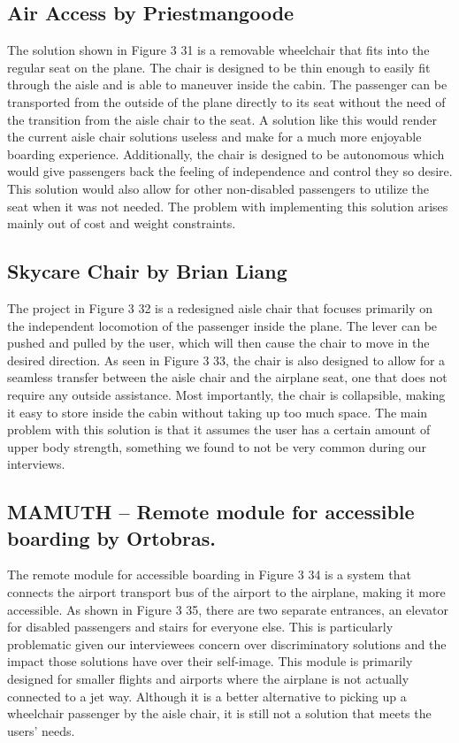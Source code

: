 \documentclass[a4paper, 12pt,conference]{new_cit_thesis}
\begin{document}
\subsection{Air Access by Priestmangoode}
The solution shown in Figure 3 31 is a removable wheelchair that fits into the regular seat on the plane. The chair is designed to be thin enough to easily fit through the aisle and is able to maneuver inside the cabin. The passenger can be transported from the outside of the plane directly to its seat without the need of the transition from the aisle chair to the seat.  A solution like this would render the current aisle chair solutions useless and make for a much more enjoyable boarding experience. Additionally, the chair is designed to be autonomous which would give passengers back the feeling of independence and control they so desire. This solution would also allow for other non-disabled passengers to utilize the seat when it was not needed. The problem with implementing this solution arises mainly out of cost and weight constraints.

\subsection{Skycare Chair by Brian Liang}
The project in Figure 3 32 is a redesigned aisle chair that focuses primarily on the independent locomotion of the passenger inside the plane. The lever can be pushed and pulled by the user, which will then cause the chair to move in the desired direction. As seen in Figure 3 33, the chair is also designed to allow for a seamless transfer between the aisle chair and the airplane seat, one that does not require any outside assistance. Most importantly, the chair is collapsible, making it easy to store inside the cabin without taking up too much space.  The main problem with this solution is that it assumes the user has a certain amount of upper body strength, something we found to not be very common during our interviews.

\subsection{MAMUTH – Remote module for accessible boarding by Ortobras.}
The remote module for accessible boarding in Figure 3 34 is a system that connects the airport transport bus of the airport to the airplane, making it more accessible. As shown in Figure 3 35, there are two separate entrances, an elevator for disabled passengers and stairs for everyone else.  This is particularly problematic given our interviewees concern over discriminatory solutions and the impact those solutions have over their self-image. This module is primarily designed for smaller flights and airports where the airplane is not actually connected to a jet way. Although it is a better alternative to picking up a wheelchair passenger by the aisle chair, it is still not a solution that meets the users’ needs.  
\end{document}
